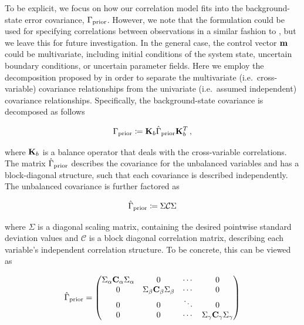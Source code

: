 To be explicit, we focus on how our correlation model fits into the
background-state error covariance, $\Gamma_{\text{prior}}$.
However, we note that the formulation could be used for specifying correlations
between observations in a similar fashion to \citet{guillet_modelling_2019}, but
we leave this for future investigation.
In the general case, the control vector $\mathbf{m}$ could be multivariate,
including initial conditions of the system state, uncertain boundary
conditions, or uncertain parameter fields.
Here we employ the decomposition proposed by
\citet{derber_reformulation_1999}
in order to separate the multivariate (i.e.\ cross-variable)
covariance relationships from the univariate (i.e.\ assumed
independent) covariance relationships.
Specifically, the background-state covariance is decomposed as follows
\begin{linenomath*}\begin{equation*}
    \Gamma_{\text{prior}} \coloneqq \mathbf{K}_{b}\hat{\Gamma}_\text{prior}\mathbf{K}_{b}^T \,
    ,
\end{equation*}\end{linenomath*}
where $\mathbf{K}_{b}$ is a balance operator that deals with the
cross-variable correlations.
The matrix $\hat{\Gamma}_\text{prior}$ describes the covariance for the unbalanced
variables and has a block-diagonal structure, such that each
covariance is described independently.
The unbalanced covariance is further factored as
\begin{linenomath*}\begin{equation*}
    \hat{\Gamma}_\text{prior} \coloneqq \Sigma \mathcal{C} \Sigma
\end{equation*}\end{linenomath*}
where $\Sigma$ is a diagonal scaling matrix, containing the desired pointwise
standard deviation values and $\mathcal{C}$ is a block diagonal correlation matrix,
describing each variable's independent correlation structure.
To be concrete, this can be viewed as
\begin{linenomath*}\begin{equation*}
    \hat{\Gamma}_\text{prior} =
    \begin{pmatrix}
        \Sigma_\alpha\mathbf{C}_\alpha\Sigma_\alpha & 0 & \cdots & 0 \\
        0 & \Sigma_\beta\mathbf{C}_\beta\Sigma_\beta & \cdots & 0 \\
        0 & 0 & \ddots & 0  \\
        0 & 0 & \cdots & \Sigma_\gamma\mathbf{C}_\gamma\Sigma_\gamma \\
    \end{pmatrix}
\end{equation*}\end{linenomath*}

